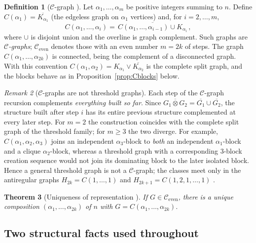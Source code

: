 \documentclass[11pt]{article}
\theoremstyle{plain}
\newtheorem{theorem}{Theorem}[section]
\theoremstyle{definition}
\newtheorem{definition}[theorem]{Definition}
\theoremstyle{remark}
\newtheorem{remark}[theorem]{Remark}
\begin{document}
	\begin{definition}[$\mathcal{C}$-graph \cite{MandalMehatari2025}]
		\label{def:cgraph}
		Let $\alpha_1,\ldots,\alpha_m$ be positive integers summing to $n$. Define $C(\alpha_1)=\overline{K_{\alpha_1}}$ (the edgeless graph on $\alpha_1$ vertices) and, for $i=2,\ldots,m$,
		\[
		C(\alpha_1,\ldots,\alpha_i)=\overline{\,C(\alpha_1,\ldots,\alpha_{i-1})\cup K_{\alpha_i}\,},
		\]
		where $\cup$ is disjoint union and the overline is graph complement. Such graphs are \emph{$\mathcal{C}$-graphs}; $\mathcal{C}_{\mathrm{even}}$ denotes those with an even number $m=2k$ of steps. The graph $C(\alpha_1,\ldots,\alpha_{2k})$ is connected, being the complement of a disconnected graph. With this convention $C(\alpha_1,\alpha_2)=K_{\alpha_1}\vee\overline{K_{\alpha_2}}$ is the complete split graph, and the blocks behave as in Proposition~\ref{prop:Cblocks} below.
	\end{definition}
	
	\begin{remark}[$\mathcal{C}$-graphs are not threshold graphs]
		\label{rem:divergence}
		Each step of the $\mathcal{C}$-graph recursion complements \emph{everything built so far}. Since $\overline{G_1\otimes G_2}=\overline{G_1}\cup\overline{G_2}$, the structure built after step $i$ has its entire previous structure complemented at every later step. For $m=2$ the construction coincides with the complete split graph of the threshold family; for $m\ge3$ the two diverge. For example, $C(\alpha_1,\alpha_2,\alpha_3)$ joins an independent $\alpha_3$-block to \emph{both} an independent $\alpha_1$-block and a clique $\alpha_2$-block, whereas a threshold graph with a corresponding $3$-block creation sequence would not join its dominating block to the later isolated block. Hence a general threshold graph is not a $\mathcal{C}$-graph; the classes meet only in the antiregular graphs $H_{2k}=C(1,\ldots,1)$ and $H_{2k+1}=C(1,2,1,\ldots,1)$ \cite{MandalMehatari2025}.
	\end{remark}
	
	\begin{theorem}[Uniqueness of representation \cite{MandalMehatari2025}]
		If $G\in\mathcal{C}_{\mathrm{even}}$, there is a unique composition $(\alpha_1,\ldots,\alpha_{2k})$ of $n$ with $G=C(\alpha_1,\ldots,\alpha_{2k})$.
	\end{theorem}
	
	\subsection{Two structural facts used throughout}
	
\end{document}
